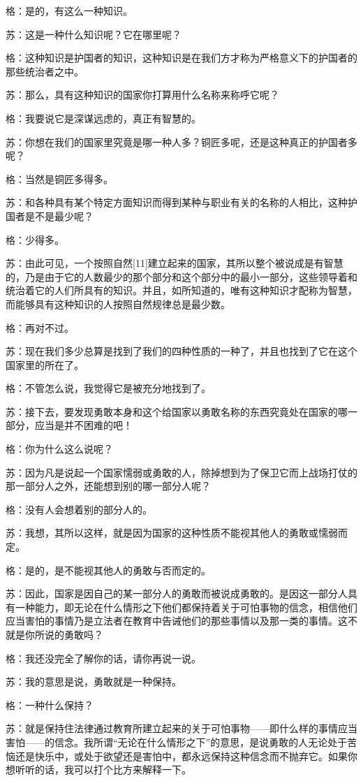 \documentclass[12pt,oneside]{book}
\begin{document}
格：是的，有这么一种知识。

苏：这是一种什么知识呢？它在哪里呢？

格：这种知识是护国者的知识，这种知识是在我们方才称为严格意义下的护国者的那些统治者之中。

苏：那么，具有这种知识的国家你打算用什么名称来称呼它呢？

格：我要说它是深谋远虑的，真正有智慧的。

苏：你想在我们的国家里究竟是哪一种人多？铜匠多呢，还是这种真正的护国者多呢？

格：当然是铜匠多得多。

苏：和各种具有某个特定方面知识而得到某种与职业有关的名称的人相比，这种护国者是不是最少呢？

格：少得多。

苏：由此可见，一个按照自然[11]建立起来的国家，其所以整个被说成是有智慧的，乃是由于它的人数最少的那个部分和这个部分中的最小一部分，这些领导着和统治着它的人们所具有的知识。并且，如所知道的，唯有这种知识才配称为智慧，而能够具有这种知识的人按照自然规律总是最少数。

格：再对不过。

苏：现在我们多少总算是找到了我们的四种性质的一种了，并且也找到了它在这个国家里的所在了。

格：不管怎么说，我觉得它是被充分地找到了。

苏：接下去，要发现勇敢本身和这个给国家以勇敢名称的东西究竟处在国家的哪一部分，应当是并不困难的吧！

格：你为什么这么说呢？

苏：因为凡是说起一个国家懦弱或勇敢的人，除掉想到为了保卫它而上战场打仗的那一部分人之外，还能想到别的哪一部分人呢？

格：没有人会想着别的部分人的。

苏：我想，其所以这样，就是因为国家的这种性质不能视其他人的勇敢或懦弱而定。

格：是的，是不能视其他人的勇敢与否而定的。

苏：因此，国家是因自己的某一部分人的勇敢而被说成勇敢的。是因这一部分人具有一种能力，即无论在什么情形之下他们都保持着关于可怕事物的信念，相信他们应当害怕的事情乃是立法者在教育中告诫他们的那些事情以及那一类的事情。这不就是你所说的勇敢吗？

格：我还没完全了解你的话，请你再说一说。

苏：我的意思是说，勇敢就是一种保持。

格：一种什么保持？

苏：就是保持住法律通过教育所建立起来的关于可怕事物——即什么样的事情应当害怕——的信念。我所谓“无论在什么情形之下”的意思，是说勇敢的人无论处于苦恼还是快乐中，或处于欲望还是害怕中，都永远保持这种信念而不抛弃它。如果你想听听的话，我可以打个比方来解释一下。
\end{document}
